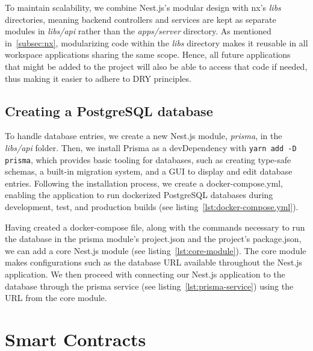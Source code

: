 To maintain scalability, we combine Nest.js's modular design with nx's \emph{libs} directories, meaning backend controllers and services are kept as separate modules in \emph{libs/api} rather than the \emph{apps/server} directory.
As mentioned in~\cref{subsec:nx}, modularizing code within the \emph{libs} directory makes it reusable in all workspace applications sharing the same scope.
Hence, all future applications that might be added to the project will also be able to access that code if needed, thus making it easier to adhere to \gls{DRY} principles.

\subsection{Creating a PostgreSQL database}\label{subsec:creating-a-postgresql-database}

To handle database entries, we create a new Nest.js module, \emph{prisma}, in the \emph{libs/api} folder.
Then, we install Prisma as a devDependency with \texttt{yarn add -D prisma}, which provides basic tooling for databases, such as creating type-safe schemas, a built-in migration system, and a \gls{GUI} to display and edit database entries.
Following the installation process, we create a docker-compose.yml, enabling the application to run dockerized PostgreSQL databases during development, test, and production builds (see listing~\ref{lst:docker-compose.yml}).


Having created a docker-compose file, along with the commands necessary to run the database in the prisma module’s project.json and the project’s package.json, we can add a core Nest.js module (see listing~\ref{lst:core-module}).
The core module makes configurations such as the database \gls{URL} available throughout the Nest.js application.
We then proceed with connecting our Nest.js application to the database through the prisma service (see listing~\ref{lst:prisma-service}) using the \gls{URL} from the core module.


\section{Smart Contracts}\label{sec:smart-contracts}

